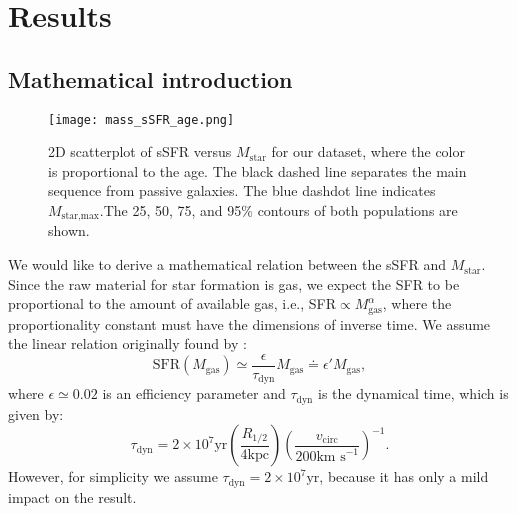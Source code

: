 \documentclass[fleqn,usenatbib]{mnras}
\begin{document}
\section{Results}\label{sec:results}
\subsection{Mathematical introduction}\label{sec:mathematical_introduction}
\begin{figure}\centering
	\texttt{[image: mass\_sSFR\_age.png]}
    \caption{2D scatterplot of sSFR versus $M_{\text{star}}$ for our dataset, where the color is proportional to the age. The black dashed line separates the main sequence from passive galaxies. The blue dashdot line indicates $M_{\text{star,max}}$.The 25, 50, 75, and 95\% contours of both populations are shown.}
    \label{fig:mass_sSFR_age}
\end{figure}
We would like to derive a mathematical relation between the sSFR and $M_\text{star}$. Since the raw material for star formation is gas, we expect the SFR to be proportional to the amount of available gas, i.e., SFR$\propto M_\text{gas}^\alpha$, where the proportionality constant must have the dimensions of inverse time. We assume the linear relation originally found by \citet{Kennicutt_1998}:
\begin{equation}
    \text{SFR}\left(M_\text{gas}\right) \simeq \dfrac{\epsilon}{\tau_\text{dyn}} M_\text{gas} \doteq \epsilon' M_\text{gas},
	\label{eq:SFR_vs_gasmas}
\end{equation}
where $\epsilon \simeq 0.02$ is an efficiency parameter and $\tau_\text{dyn}$ is the dynamical time, which is given by:
\begin{equation}
    \tau_\text{dyn} = 2 \times 10^7 \text{yr} \left(\dfrac{R_{1\slash2}}{4\text{kpc}}\right) \left(\dfrac{v_\text{circ}}{200\text{km s}^{-1}}\right)^{-1}.
	\label{eq:t_dynamical}
\end{equation}
However, for simplicity we assume $\tau_\text{dyn} = 2 \times 10^7 \text{yr}$, because it has only a mild impact on the result.
\end{document}
